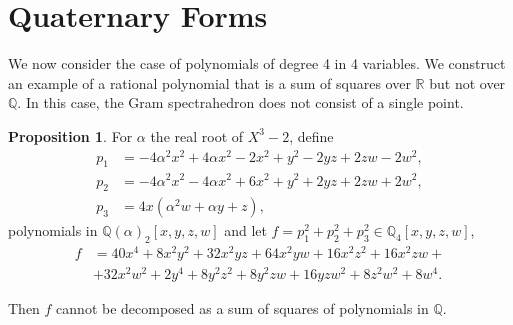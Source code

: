 \documentclass[a4paper,11pt]{amsart}%
\newcommand\Q{\mathbb{Q}}
\newcommand\R{\mathbb{R}}
\theoremstyle{definition}
\newtheorem{prop}[theorem]{Proposition}
\begin{document}
\section{Quaternary Forms}

We now consider the case of polynomials of degree 4 in 4 variables. We construct an example of a rational polynomial that is a sum of squares over $\R$ but not over $\Q$. In this case, the Gram spectrahedron does not consist of a single point. 

\begin{prop}\label{4-4}
For $\alpha$ the real root of $X^3-2$, define
\begin{align*}
p_1 &= -4\alpha^2x^2+4\alpha x^2-2x^2+y^2-2yz+2zw-2w^2, \\
p_2 &= -4\alpha^2x^2-4\alpha x^2+6x^2+y^2+2yz+2zw+2w^2, \\
p_3 &= 4x(\alpha^2w+\alpha y+z),
\end{align*}
polynomials in $\Q(\alpha)_2[x,y,z,w]$ and let $f=p_1^2+p_2^2+p_3^2\in \Q_4[x,y,z,w]$,
\begin{align*}
f&=40x^4+8x^2y^2+32x^2yz+64x^2yw+16x^2z^2+16x^2zw+\\
&+32x^2w^2+2y^4+8y^2z^2+8y^2zw+16yzw^2+8z^2w^2+8w^4.
\end{align*}

Then $f$ cannot be decomposed as a sum of squares of polynomials in $\Q$.
\end{prop}
\end{document}
